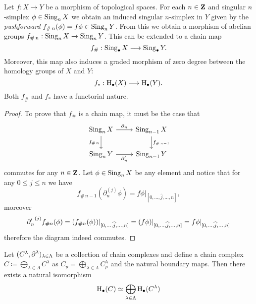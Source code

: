 \begin{proposition}
    \label{prop:induced-chain-map-and-homology-map}
    Let \(f: X \to Y\) be a morphism of topological spaces. For each \(n \in \mathbf{Z}\)
    and singular \(n\)-simplex \(\phi \in \operatorname{Sing}_n X\) we obtain an induced singular
    \(n\)-simplex in \(Y\) given by the \emph{pushforward}
    \(f_{\#\, n}(\phi) = f \phi \in \operatorname{Sing}_n Y\). From this we obtain a morphism of
    abelian groups \(f_{\#\, n}: \operatorname{Sing}_n X \to \operatorname{Sing}_n Y\). This can be extended to
    a chain map
    \[
        f_{\#}: \operatorname{Sing}_{\bullet} X \longrightarrow \operatorname{Sing}_{\bullet} Y.
    \]
    Moreover, this map also induces a graded morphism of zero degree between the
    homology groups of \(X\) and \(Y\):
    \[
        f_{*}: \operatorname{H}_{\bullet}(X) \longrightarrow \operatorname{H}_{\bullet}(Y).
    \]
    Both \(f_{\#}\) and \(f_{*}\) have a functorial nature.
\end{proposition}

\begin{proof}
    To prove that \(f_{\#}\) is a chain map, it must be the case that
    \[
        \begin{tikzcd}
            \Sing_n X \ar[d, "f_{\#\, n}"'] \ar[r, "\face_n"]
            &\Sing_{n-1} X \ar[d, "f_{\#\, n-1}"]
            \\
            \Sing_n Y \ar[r, "\face_n'"']
            &\Sing_{n-1} Y
        \end{tikzcd}
    \]
    commutes for any \(n \in \mathbf{Z}\). Let \(\phi \in \operatorname{Sing}_n X\) be any element and
    notice that for any \(0 \leq j \leq n\) we have
    \[
        f_{\#\, n-1}(\partial_n^{(j)} \phi)
        = f \phi|_{[0, \dots, \widehat j, \dots, n]},
    \]
    moreover
    \[
        {\operatorname{\partial}_n'}^{(j)} f_{\# n}(\phi)
        = (f_{\# n} (\phi))|_{[0, \dots, \widehat j, \dots, n]}
        = (f \phi)|_{[0, \dots, \widehat j, \dots, n]}
        = f \phi|_{[0, \dots, \widehat j, \dots, n]}
    \]
    therefore the diagram indeed commutes.
\end{proof}

\begin{proposition}
    \label{prop:direct-sum-of-chain-complexes}
    Let \((C^{\lambda}, \operatorname{\partial}^{\lambda})_{\lambda \in \Lambda}\) be a collection of chain
    complexes and define a chain complex \(C \coloneq \bigoplus_{\lambda \in
        \Lambda} C^{\lambda}\) as \(C_p = \bigoplus_{\lambda \in \Lambda}
    C_p^{\lambda}\) and the natural boundary maps. Then there exists a natural isomorphism
    \[
        \operatorname{H}_{\bullet}(C) \simeq \bigoplus_{\lambda \in \Lambda} \operatorname{H}_{\bullet}(C^{\lambda})
    \]
\end{proposition}


